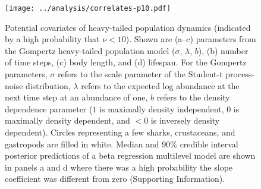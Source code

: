 \begin{figure}[htbp]
\begin{center}
\texttt{[image: ../analysis/correlates-p10.pdf]}
\caption{
Potential covariates of heavy-tailed population dynamics (indicated by a high
probability that $\nu < 10$). Shown are (a--c) parameters from the Gompertz
heavy-tailed population model ($\sigma$, $\lambda$, $b$), (b) number of time
steps, (c) body length, and (d) lifespan. For the Gompertz parameters, $\sigma$
refers to the scale parameter of the Student-t process-noise distribution,
$\lambda$ refers to the expected log abundance at the next time step at an
abundance of one, $b$ refers to the density dependence parameter ($1$ is
maximally density independent, $0$ is maximally density dependent, and $<0$ is
inversely density dependent).
Circles representing a few sharks, crustaceans, and gastropods are filled in
white. Median and 90\% credible interval posterior predictions of a beta
regression multilevel model are shown in panels a and d where there was a high
probability the slope coefficient was different from zero (Supporting
Information).
}
\label{fig:correlates}
\end{center}
\end{figure}
